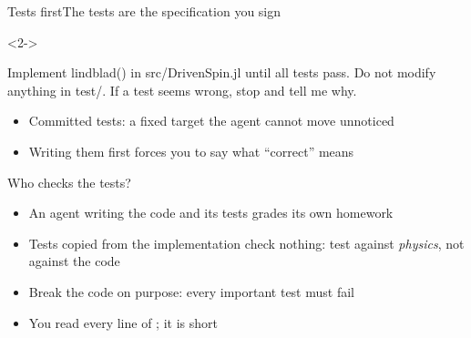 \begin{frame}[fragile]{Tests first}{The tests are the specification you sign}
  \begin{center}
  \end{center}
\begin{onlyenv}<2->
\begin{prompt}
Implement lindblad() in src/DrivenSpin.jl until all tests pass.
Do not modify anything in test/. If a test seems wrong, stop and tell me why.
\end{prompt}
\end{onlyenv}
  \begin{itemize}
    \item<2-> Committed tests: a fixed target the agent cannot move unnoticed
    \item<3-> Writing them first forces you to say what ``correct'' means
  \end{itemize}
\end{frame}

\begin{frame}{Who checks the tests?}
  \begin{itemize}
    \item An agent writing the code and its tests grades its own homework
    \item<2-> Tests copied from the implementation check nothing:
          test against \emph{physics}, not against the code
    \item<3-> Break the code on purpose: every important test must fail
    \item<4-> You read every line of ; it is short
  \end{itemize}

  \vspace{3ex}
\end{frame}

